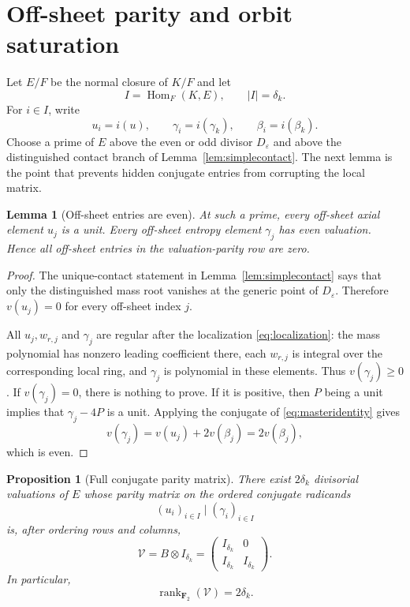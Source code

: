 \documentclass[11pt,a4paper]{article}
\newtheorem{proposition}[theorem]{Proposition}
\newtheorem{lemma}[theorem]{Lemma}
\theoremstyle{definition}
\theoremstyle{remark}
\newcommand{\Ftwo}{\mathbf F_2}
\newcommand{\Hom}{\operatorname{Hom}}
\newcommand{\eps}{\varepsilon}
\begin{document}
\section{Off-sheet parity and orbit saturation}
\label{sec:orbit}

Let $E/F$ be the normal closure of $K/F$ and let
\[
 I=\Hom_F(K,E),\qquad |I|=\delta_k.
\]
For $i\in I$, write
\[
 u_i=i(u),\qquad \gamma_i=i(\gamma_k),\qquad \beta_i=i(\beta_k).
\]
Choose a prime of $E$ above the even or odd divisor $D_\eps$ and above the
distinguished contact branch of Lemma~\ref{lem:simplecontact}.  The next lemma
is the point that prevents hidden conjugate entries from corrupting the local
matrix.

\begin{lemma}[Off-sheet entries are even]
\label{lem:offsheet}
At such a prime, every off-sheet axial element $u_j$ is a unit.  Every
off-sheet entropy element $\gamma_j$ has even valuation.  Hence all
off-sheet entries in the valuation-parity row are zero.
\end{lemma}

\begin{proof}
The unique-contact statement in Lemma~\ref{lem:simplecontact} says that only
the distinguished mass root vanishes at the generic point of $D_\eps$.
Therefore $v(u_j)=0$ for every off-sheet index $j$.

All $u_j,w_{r,j}$ and $\gamma_j$ are regular after the localization
\eqref{eq:localization}: the mass polynomial has nonzero leading coefficient
there, each $w_{r,j}$ is integral over the corresponding local ring, and
$\gamma_j$ is polynomial in these elements.  Thus $v(\gamma_j)\geq0$.
If $v(\gamma_j)=0$, there is nothing to prove.  If it is positive, then
$P$ being a unit implies that $\gamma_j-4P$ is a unit.  Applying the conjugate
of \eqref{eq:masteridentity} gives
\[
 v(\gamma_j)
 =v(u_j)+2v(\beta_j)=2v(\beta_j),
\]
which is even.
\end{proof}

\begin{proposition}[Full conjugate parity matrix]
\label{prop:fullmatrix}
There exist $2\delta_k$ divisorial valuations of $E$ whose parity matrix on
the ordered conjugate radicands
\[
 (u_i)_{i\in I}\mid(\gamma_i)_{i\in I}
\]
is, after ordering rows and columns,
\begin{equation}
 \mathcal V=B\otimes I_{\delta_k}
 =
 \begin{pmatrix}
 I_{\delta_k}&0\\
 I_{\delta_k}&I_{\delta_k}
 \end{pmatrix}.
 \label{eq:fullmatrix}
\end{equation}
In particular,
\[
 \operatorname{rank}_{\Ftwo}(\mathcal V)=2\delta_k.
\]
\end{proposition}
\end{document}
